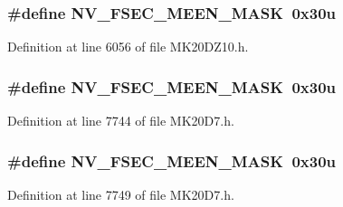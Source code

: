 \subsubsection[{\texorpdfstring{N\+V\+\_\+\+F\+S\+E\+C\+\_\+\+M\+E\+E\+N\+\_\+\+M\+A\+SK}{NV_FSEC_MEEN_MASK}}]{\setlength{\rightskip}{0pt plus 5cm}\#define N\+V\+\_\+\+F\+S\+E\+C\+\_\+\+M\+E\+E\+N\+\_\+\+M\+A\+SK~0x30u}\hypertarget{group___n_v___register___masks_ga02f5aa86e1f5bceefd0378fa736d5656}{}\label{group___n_v___register___masks_ga02f5aa86e1f5bceefd0378fa736d5656}


Definition at line 6056 of file M\+K20\+D\+Z10.\+h.

\subsubsection[{\texorpdfstring{N\+V\+\_\+\+F\+S\+E\+C\+\_\+\+M\+E\+E\+N\+\_\+\+M\+A\+SK}{NV_FSEC_MEEN_MASK}}]{\setlength{\rightskip}{0pt plus 5cm}\#define N\+V\+\_\+\+F\+S\+E\+C\+\_\+\+M\+E\+E\+N\+\_\+\+M\+A\+SK~0x30u}\hypertarget{group___n_v___register___masks_ga02f5aa86e1f5bceefd0378fa736d5656}{}\label{group___n_v___register___masks_ga02f5aa86e1f5bceefd0378fa736d5656}


Definition at line 7744 of file M\+K20\+D7.\+h.

\subsubsection[{\texorpdfstring{N\+V\+\_\+\+F\+S\+E\+C\+\_\+\+M\+E\+E\+N\+\_\+\+M\+A\+SK}{NV_FSEC_MEEN_MASK}}]{\setlength{\rightskip}{0pt plus 5cm}\#define N\+V\+\_\+\+F\+S\+E\+C\+\_\+\+M\+E\+E\+N\+\_\+\+M\+A\+SK~0x30u}\hypertarget{group___n_v___register___masks_ga02f5aa86e1f5bceefd0378fa736d5656}{}\label{group___n_v___register___masks_ga02f5aa86e1f5bceefd0378fa736d5656}


Definition at line 7749 of file M\+K20\+D7.\+h.

